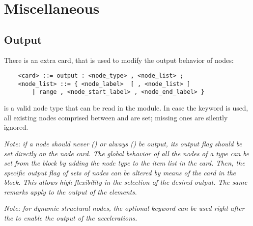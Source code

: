 \section{Miscellaneous}

\subsection{Output}\label{sec:NODE:MISC:OUTPUT}
There is an extra card, that is used to modify the output behavior of nodes:  
\begin{verbatim}
    <card> ::= output : <node_type> , <node_list> ;
    <node_list> ::= { <node_label>  [ , <node_list> ] 
        | range , <node_start_label> , <node_end_label> }
\end{verbatim}
 is a valid node type that can be read in the 
module.
In case the keyword  is used, all existing nodes comprised
between  and 
are set; missing ones are silently ignored.

\noindent
{\em
   Note: if a node should never () or always () be output,
   its output flag should be set directly on the node card. 
   The global behavior of all the nodes of a type can be set from the 
    block by adding the node type to the item list in the 
    card. 
   Then, the specific output flag of sets of nodes can be altered by means 
   of the  card in the  block. 
   This allows high flexibility in the selection of the desired output. 
   The same remarks apply to the output of the elements.
}

{\em
    Note: for dynamic structural nodes, the optional keyword 
    can be used right after the  to enable the output
    of the accelerations.
}

